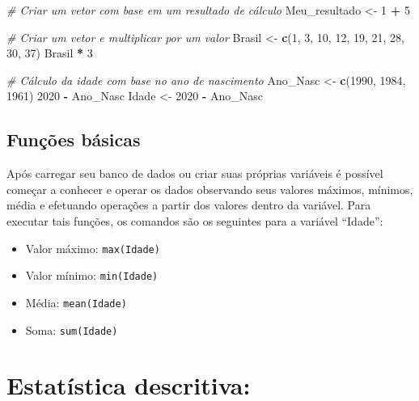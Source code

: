 \documentclass[
  brazil,
]{book}
\newenvironment{Shaded}{\begin{snugshade}}{\end{snugshade}}
\newcommand{\CommentTok}[1]{\textcolor[rgb]{0.56,0.35,0.01}{\textit{#1}}}
\newcommand{\DecValTok}[1]{\textcolor[rgb]{0.00,0.00,0.81}{#1}}
\newcommand{\KeywordTok}[1]{\textcolor[rgb]{0.13,0.29,0.53}{\textbf{#1}}}
\newcommand{\NormalTok}[1]{#1}
\newcommand{\OperatorTok}[1]{\textcolor[rgb]{0.81,0.36,0.00}{\textbf{#1}}}
\newcommand{\StringTok}[1]{\textcolor[rgb]{0.31,0.60,0.02}{#1}}
\providecommand{\tightlist}{%
  \setlength{\itemsep}{0pt}\setlength{\parskip}{0pt}}
\begin{document}
\begin{Shaded}
\begin{Highlighting}[]
\CommentTok{# Criar um vetor com base em um resultado de cálculo}
\NormalTok{Meu_resultado <-}\StringTok{ }\DecValTok{1} \OperatorTok{+}\StringTok{ }\DecValTok{5}

\CommentTok{# Criar um vetor e multiplicar por um valor}
\NormalTok{Brasil <-}\StringTok{ }\KeywordTok{c}\NormalTok{(}\DecValTok{1}\NormalTok{, }\DecValTok{3}\NormalTok{, }\DecValTok{10}\NormalTok{, }\DecValTok{12}\NormalTok{, }\DecValTok{19}\NormalTok{, }\DecValTok{21}\NormalTok{, }\DecValTok{28}\NormalTok{, }\DecValTok{30}\NormalTok{, }\DecValTok{37}\NormalTok{)}
\NormalTok{Brasil }\OperatorTok{*}\StringTok{ }\DecValTok{3}

\CommentTok{# Cálculo da idade com base no ano de nascimento}
\NormalTok{Ano_Nasc <-}\StringTok{ }\KeywordTok{c}\NormalTok{(}\DecValTok{1990}\NormalTok{, }\DecValTok{1984}\NormalTok{, }\DecValTok{1961}\NormalTok{)}
\DecValTok{2020} \OperatorTok{-}\StringTok{ }\NormalTok{Ano_Nasc}
\NormalTok{Idade <-}\StringTok{ }\DecValTok{2020} \OperatorTok{-}\StringTok{ }\NormalTok{Ano_Nasc}
\end{Highlighting}
\end{Shaded}

\hypertarget{funuxe7uxf5es-buxe1sicas}{%
\subsection{Funções básicas}\label{funuxe7uxf5es-buxe1sicas}}

Após carregar seu banco de dados ou criar suas próprias variáveis é possível começar a conhecer e operar os dados observando seus valores máximos, mínimos, média e efetuando operações a partir dos valores dentro da variável. Para executar tais funções, os comandos são os seguintes para a variável ``Idade'':

\begin{itemize}
\tightlist
\item
  Valor máximo: \texttt{max(Idade)}
\item
  Valor mínimo: \texttt{min(Idade)}
\item
  Média: \texttt{mean(Idade)}
\item
  Soma: \texttt{sum(Idade)}
\end{itemize}

\hypertarget{estatuxedstica-descritiva}{%
\section{Estatística descritiva:}\label{estatuxedstica-descritiva}}
\end{document}
